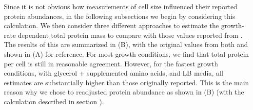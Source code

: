 \begin{figure}
\end{figure}

Since it is not obvious how measurements of cell size influenced their reported
protein abundances, in the following subsections we begin by considering this
calculation. We then consider three different approaches to estimate the
growth-rate dependent total protein mass to compare with those values reported
from \cite{schmidt2016}. The results of this are summarized in
(B), with the original values from both
\cite{schmidt2016} and \cite{li2014} shown in (A) for
reference. For most growth conditions, we find that total protein per cell is
still in reasonable agreement. However, for the fastest growth conditions, with
glycerol + supplemented amino acids, and LB media, all estimates are
substantially higher than those originally reported. This is the main reason why
we chose to readjusted protein abundance as shown in
(B) (with the calculation described in section
).


